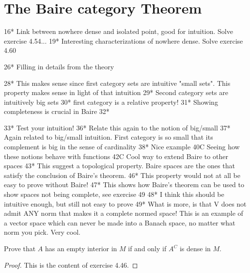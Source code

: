 \section{The Baire category Theorem}

16* Link between nowhere dense and isolated point, good for intuition. Solve exercise 4.54...
19* Interesting characterizations of nowhere dense. Solve exercise 4.60

26* Filling in details from the theory 

28* This makes sense since first category sets are intuitive "small sets". This property makes sense in light of that intuition
29* Second category sets are intuitively big sets 
30* first category is a relative property!
31* Showing completeness is crucial in Baire 
32* 

33* Test your intuition! 
36* Relate this again to the notion of big/small 
37* Again related to big/small intuition. First category is so small that its complement is big in the sense of cardinality 
38* Nice example 
40C Seeing how these notions behave with functions 
42C Cool way to extend Baire to other spaces 
43* This suggest a topological property. Baire spaces are the ones that satisfy the conclusion of Baire's theorem.
46* This property would not at all be easy to prove without Baire!
47* This shows how Baire's theorem can be used to show spaces not being complete, see exercise 49
48* I think this should be intuitive enough, but still not easy to prove 
49* What is more, is that V does not admit ANY norm that makes it a complete normed space! This is an example of a vector space which can never be made into a Banach space, no matter what norm you pick. Very cool. 


\begin{exercise}{14}
Prove that $A$ has an empty interior in $M$ if and only if $A^C$ is dense in $M$.
\end{exercise}
\begin{proof}
This is the content of exercise 4.46.
\end{proof} 

